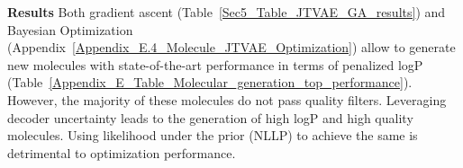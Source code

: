 \textbf{Results} Both gradient ascent (Table~\ref{Sec5_Table_JTVAE_GA_results}) and Bayesian Optimization (Appendix~\ref{Appendix_E.4_Molecule_JTVAE_Optimization}) allow to generate new molecules with state-of-the-art performance in terms of penalized logP (Table~\ref{Appendix_E_Table_Molecular_generation_top_performance}). However, the majority of these molecules do not pass quality filters. Leveraging decoder uncertainty leads to the generation of high logP and high quality molecules. Using likelihood under the prior (NLLP) to achieve the same is detrimental to optimization performance.

